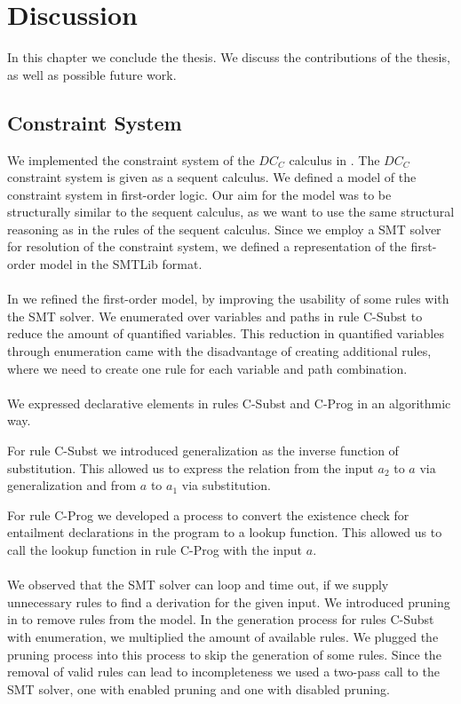 \chapter{Discussion}
In this chapter we conclude the thesis.
We discuss the contributions of the thesis,
as well as possible future work.

\section{Constraint System}
We implemented the constraint system of the $DC_C$ calculus
in .
The $DC_C$ constraint system is given as a sequent calculus.
We defined a model of the constraint system in first-order logic.
Our aim for the model was to be structurally similar to the sequent calculus,
as we want to use the same structural reasoning
as in the rules of the sequent calculus.
Since we employ a SMT solver for resolution of the constraint system,
we defined a representation of the first-order model in the SMTLib format.\\
\\
In  we refined the first-order model,
by improving the usability of some rules with the SMT solver.
We enumerated over variables and paths in rule C-Subst
to reduce the amount of quantified variables.
This reduction in quantified variables through enumeration came
with the disadvantage of creating additional rules,
where we need to create one rule for each variable and path combination.\\
\\
We expressed declarative elements in rules C-Subst and C-Prog in an algorithmic way.

For rule C-Subst we introduced generalization as the inverse function of substitution.
This allowed us to express the relation from the input $a_2$ to $a$ via generalization
and from $a$ to $a_1$ via substitution.

For rule C-Prog we developed a process to convert the existence check for
entailment declarations in the program to a lookup function.
This allowed us to call the lookup function in rule C-Prog with the input $a$.\\
\\
We observed that the SMT solver can loop and time out,
if we supply unnecessary rules to find a derivation
for the given input.
We introduced pruning in  to
remove rules from the model.
In the generation process for rules C-Subst with enumeration,
we multiplied the amount of available rules.
We plugged the pruning process into this process
to skip the generation of some rules.
Since the removal of valid rules can lead to incompleteness
we used a two-pass call to the SMT solver,
one with enabled pruning and one with disabled pruning.


